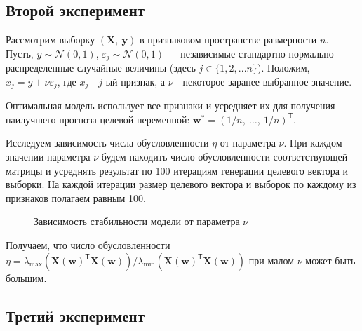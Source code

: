 \documentclass[12pt, twoside]{article}
\newcommand{\by}{\mathbf{y}}
\newcommand{\bw}{\mathbf{w}}
\newcommand{\bX}{\mathbf{X}}
\newcommand{\cN}{\mathcal{N}}
\newcommand{\getT}{^{\mathsf{T}}}
\begin{document}
\subsection{Второй эксперимент}

Рассмотрим выборку $(\bX, \:\by)$ в признаковом пространстве размерности $n$. Пусть, $y \sim \cN(0, 1)$, $ \varepsilon_j \sim \cN(0, 1)$ ~-- независимые стандартно нормально распределенные случайные величины (здесь $j \in \{1, 2, ... n\}$). Положим, $x_j = y + \nu \varepsilon_j$, где $x_j$ - $j$-ый признак, а $\nu$ - некоторое заранее выбранное значение.

Оптимальная модель использует все признаки и усредняет их для получения наилучшего прогноза целевой переменной: $\bw^* = (1 / n,\:\ldots,\:1 / n)\getT$.

Исследуем зависимость числа обусловленности $\eta$ от параметра $\nu$. При каждом значении параметра $\nu$ будем находить число обусловленности соответствующей матрицы и усреднять результат по 100 итерациям генерации целевого вектора и выборки. На каждой итерации размер целевого вектора и выборок по каждому из признаков полагаем равным 100.

\begin{figure}[htb]
\caption{Зависимость стабильности модели от параметра $\nu$}
\label{first_exp}
\end{figure}

Получаем, что число обусловленности $\eta = \lambda_{\max}(\bX(\bw)\getT\bX(\bw)) / \lambda_{\min}(\bX(\bw)\getT\bX(\bw))$ при малом $\nu$ может быть большим.


\subsection{Третий эксперимент}
\end{document}
